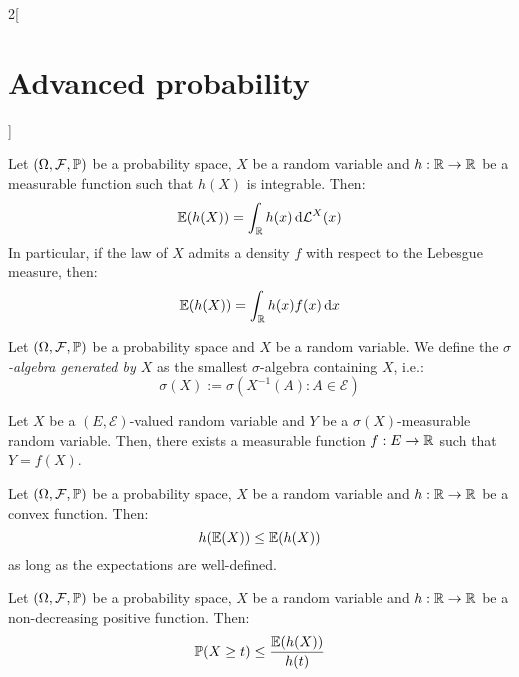 \documentclass[../../../main_math.tex]{subfiles}
\begin{document}
\begin{multicols}{2}[\section{Advanced probability}]
\begin{proposition}
    Let $(\Omega,\mathcal{F},\mathbb{P})$ be a probability space, $X$ be a random variable and $h:\mathbb{R}\to \mathbb{R}$ be a measurable function such that $h(X)$ is integrable. Then:
    $$
      \mathbb{E}(h(X))=\int_{\mathbb{R}}{h(x)\dd{\mathcal{L}^X(x)}}
    $$
    In particular, if the law of $X$ admits a density $f$ with respect to the Lebesgue measure, then:
    $$
      \mathbb{E}(h(X))=\int_{\mathbb{R}}{h(x)f(x)\dd{x}}
    $$
  \end{proposition}
  \begin{definition}
    Let $(\Omega,\mathcal{F},\mathbb{P})$ be a probability space and $X$ be a random variable. We define the \emph{$\sigma$-algebra generated by $X$} as the smallest $\sigma$-algebra containing $X$, i.e.:
    $$
      \sigma(X):=\sigma(X^{-1}(A):A\in\mathcal{E})
    $$
  \end{definition}
  \begin{proposition}
    Let $X$ be a $(E,\mathcal{E})$-valued random variable and $Y$ be a $\sigma(X)$-measurable random variable. Then, there exists a measurable function $f:E\to \mathbb{R}$ such that $Y=f(X)$.
  \end{proposition}
  \begin{proposition}
    Let $(\Omega,\mathcal{F},\mathbb{P})$ be a probability space, $X$ be a random variable and $h:\mathbb{R}\to \mathbb{R}$ be a convex function. Then:
    $$
      h(\mathbb{E}(X))\leq \mathbb{E}(h(X))
    $$
    as long as the expectations are well-defined.
  \end{proposition}
  \begin{proposition}
    Let $(\Omega,\mathcal{F},\mathbb{P})$ be a probability space, $X$ be a random variable and $h:\mathbb{R}\to \mathbb{R}$ be a non-decreasing positive function. Then:
    $$
      \mathbb{P}(X\geq t)\leq \frac{\mathbb{E}(h(X))}{h(t)}
    $$
  \end{proposition}
\end{multicols}
\end{document}
